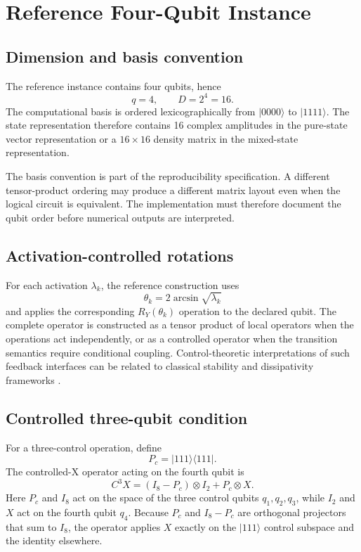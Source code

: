 \documentclass[final,3p,times]{elsarticle}
\begin{document}
\section{Reference Four-Qubit Instance}

\subsection{Dimension and basis convention}

The reference instance contains four qubits, hence
\begin{equation}
    q=4,
    \qquad
    D=2^4=16.
\end{equation}
The computational basis is ordered lexicographically from $|0000\rangle$ to $|1111\rangle$. The state representation therefore contains 16 complex amplitudes in the pure-state vector representation or a $16\times16$ density matrix in the mixed-state representation.

The basis convention is part of the reproducibility specification. A different tensor-product ordering may produce a different matrix layout even when the logical circuit is equivalent. The implementation must therefore document the qubit order before numerical outputs are interpreted.

\subsection{Activation-controlled rotations}

For each activation $\lambda_k$, the reference construction uses
\begin{equation}
    \theta_k=2\arcsin\sqrt{\lambda_k}
\end{equation}
and applies the corresponding $R_Y(\theta_k)$ operation to the declared qubit. The complete operator is constructed as a tensor product of local operators when the operations act independently, or as a controlled operator when the transition semantics require conditional coupling. Control-theoretic interpretations of such feedback interfaces can be related to classical stability and dissipativity frameworks \cite{ref17,ref18,ref19}.

\subsection{Controlled three-qubit condition}

For a three-control operation, define
\begin{equation}
    P_c=|111\rangle\langle111|.
\end{equation}
The controlled-X operator acting on the fourth qubit is
\begin{equation}
    C^3X=(I_8-P_c)\otimes I_2+P_c\otimes X.
\end{equation}
Here $P_c$ and $I_8$ act on the space of the three control qubits $q_1,q_2,q_3$, while $I_2$ and $X$ act on the fourth qubit $q_4$. Because $P_c$ and $I_8-P_c$ are orthogonal projectors that sum to $I_8$, the operator applies $X$ exactly on the $|111\rangle$ control subspace and the identity elsewhere.
\end{document}
